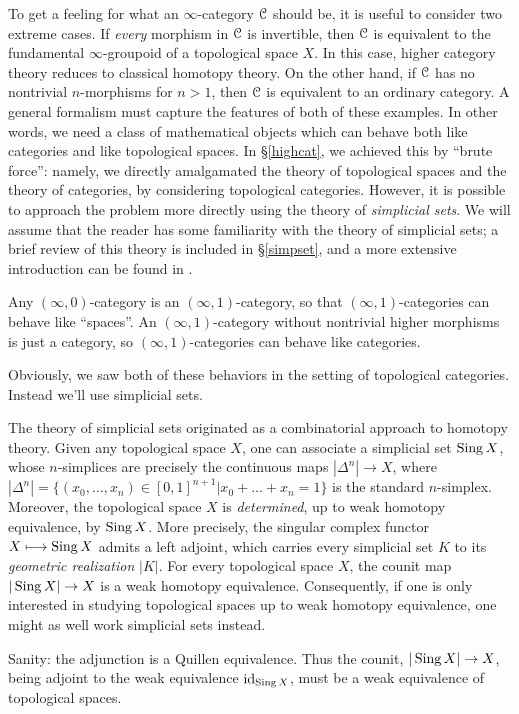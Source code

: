 \begin{1.1.2 inf-Categories}
To get a feeling for what an $\infty$-category $\operatorname{\mathcal{C}}$ should be, it is useful to consider two extreme cases. If {\em every} morphism in $\operatorname{\mathcal{C}}$ is invertible, then $\operatorname{\mathcal{C}}$ is equivalent to the fundamental $\infty$-groupoid of a topological space $X$. In this case, higher category theory reduces to classical homotopy theory. On the other hand, if $\operatorname{\mathcal{C}}$ has no nontrivial $n$-morphisms for $n > 1$, then $\operatorname{\mathcal{C}}$ is equivalent to an ordinary category. A general formalism must capture the features of both of these examples. In other words, we need
a class of mathematical objects which can behave both like categories and like topological spaces. In \S \ref{highcat}, we achieved this by ``brute force'': namely, we directly amalgamated the theory of topological spaces and the theory of categories, by considering topological categories.
However, it is possible to approach the problem more directly using the theory of
{\em simplicial sets}. 
We will assume that the reader has some familiarity with the theory of simplicial sets; a brief review of this theory is included in \S \ref{simpset}, and a more extensive introduction can be found in \cite{goerssjardine}.
\begin{shaded}
Any $(\infty,0)$-category is an $(\infty,1)$-category, so that $(\infty,1)$-categories can behave like ``spaces''. An $(\infty,1)$-category without nontrivial higher morphisms is just a category, so $(\infty,1)$-categories can behave like categories.

Obviously, we saw both of these behaviors in the setting of topological categories. Instead we'll use simplicial sets.
\end{shaded}

The theory of simplicial sets originated as a combinatorial approach to homotopy theory. Given any topological space $X$, one can associate a simplicial set $\operatorname{Sing} X$, whose $n$-simplices are precisely the continuous maps $| \Delta^n | \rightarrow X$, where $|\Delta^n| = \{ (x_0, \ldots, x_n) \in [0,1]^{n+1} | x_0 + \ldots + x_n =1 \}$ is the standard $n$-simplex. Moreover, the topological space $X$ is {\em determined}, up to weak homotopy equivalence, by $\operatorname{Sing} X$. More precisely, the singular complex functor $X \longmapsto \operatorname{Sing} X$
admits a left adjoint, which carries every simplicial set $K$ to its {\it geometric realization} $|K|$. For every topological space $X$, the counit map  $| \operatorname{Sing} X | \rightarrow X$ is a weak homotopy equivalence. Consequently, if one is only interested in studying topological spaces up to weak homotopy equivalence, one might as well work simplicial sets instead.
\begin{shaded}
Sanity: the adjunction 
is a Quillen equivalence. Thus the counit, $| \operatorname{Sing} X | \rightarrow X$, being adjoint to the weak equivalence $\operatorname{id}_{\operatorname{Sing} X}$, must be a weak equivalence of topological spaces.


\end{shaded}
\end{1.1.2 inf-Categories}
